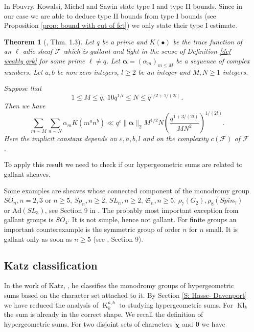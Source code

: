 \documentclass[12pt]{amsart}
\theoremstyle{plain}
\newtheorem{thm}{Theorem}[section]
\theoremstyle{definition}
\theoremstyle{remark}
\numberwithin{equation}{section}
\renewcommand{\geq}{\geqslant}
\renewcommand{\leq}{\leqslant}
\DeclareMathOperator{\Kl}{Kl}%
\DeclareMathOperator{\K}{K} %
\begin{document}
In \cite{FKMSbilinear} Fouvry, Kowalsi, Michel and Sawin state type I and type II bounds. Since in our case we are able to deduce type II bounds from type I bounds (see Proposition \ref{prop: bound with cut of fct}) we only state their type I estimate. 

\begin{thm}[\cite{FKMSbilinear}, Thm. 1.3]\label{thm weakly gkr from fkms}
    Let $q$ be a prime and $K(\bullet)$ be the trace function of an $\ell$-adic sheaf $\mathcal{F}$ which is gallant and light in the sense of Definition \ref{def weakly grk} for some prime $\ell\neq q$. Let $\bm\alpha =(\alpha_m)_{m\leq M}$ be a sequence of complex numbers.
Let $a,b$ be non-zero integers, $l\geq 2$ be an integer and $M, N \geq 1$ integers. 

    \item Suppose that \begin{equation*}
   1\leq M\leq q,\ 10q^{1/l}\leq N\leq q^{1/2+1/(2l)}.
\end{equation*} 
Then we have
\begin{equation*}
\sum_{m\sim M}\sum_{n\sim N}\alpha_mK(m^an^b)\ll q^{\varepsilon}\|\bm \alpha\|_2M^{1/2}N\left(\frac{q^{1+3/(2l)}}{MN^2}\right)^{1/(2l)}.
\end{equation*}
Here the implicit constant depends on $\varepsilon,a,b,l$ and on the complexity $c(\mathcal{F})$ of $\mathcal{F}$. 

\end{thm}
To apply this result we need to check if our hypergeometric sums are related to gallant sheaves. 

Some examples are sheaves whose connected component of the monodromy group $SO_n, n=2,3 \text{ or }n\geq 5$, $Sp_n, n\geq 2$, $SL_n, n\geq 2$, $\mathfrak{S}_n, n\geq 5$, $\rho_7(G_2), \rho_8(Spin_7)$ or $\mathrm{Ad}(SL_3)$, see Section 9 in \cite{FKMSbilinear}.    
The probably most important exception from gallant groups is $SO_4$. It is not simple, hence not gallant. For finite groups an important counterexample is the symmetric group of order $n$ for $n$ small. It is gallant only as soon as $n\geq 5$ (see \cite{FKMSbilinear}, Section 9).   



\subsection{Katz classification }
In the work of Katz, \cite{Katzbook}, he classifies the monodromy groups of hypergeometric sums based on the character set attached to it.
By Section \ref{S: Hasse- Davenport} we have reduced the analysis of $\K_k^{a,b}$ to studying hypergeometric sums. For $\Kl_k$ the sum is already in the correct shape. We recall the definition of hypergeometric sums. For two disjoint sets of characters $\bm\chi$ and $\bm \theta$ we have
\end{document}
